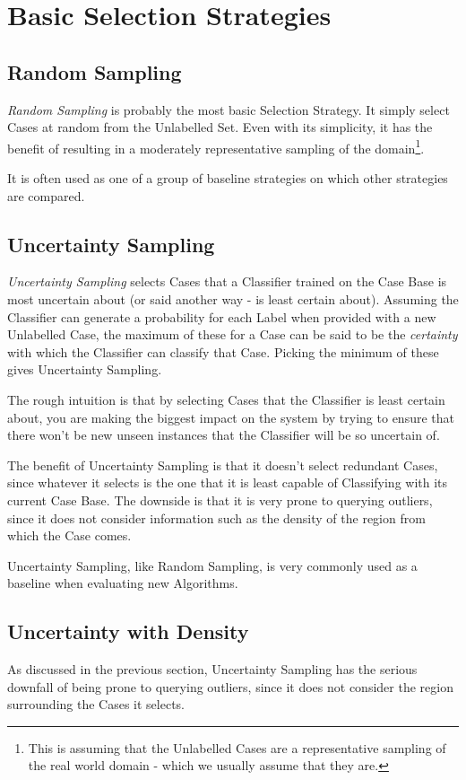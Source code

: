 \documentclass[a4paper,11pt]{report}
\begin{document}
\section{Basic Selection Strategies}
\subsection{Random Sampling}
\emph{Random Sampling} is probably the most basic Selection Strategy. It simply select Cases at random from the Unlabelled Set. Even with its simplicity, it has the benefit of resulting in a moderately representative sampling of the domain\footnote{This is assuming that the Unlabelled Cases are a representative sampling of the real world domain - which we usually assume that they are.}.

It is often used as one of a group of baseline strategies on which other strategies are compared.

\subsection{Uncertainty Sampling}
\emph{Uncertainty Sampling}\citep{Lewis1994} selects Cases that a Classifier trained on the Case Base is most uncertain about (or said another way - is least certain about). Assuming the Classifier can generate a probability for each Label when provided with a new Unlabelled Case, the maximum of these for a Case can be said to be the \emph{certainty} with which the Classifier can classify that Case. Picking the minimum of these gives Uncertainty Sampling.

The rough intuition is that by selecting Cases that the Classifier is least certain about, you are making the biggest impact on the system by trying to ensure that there won't be new unseen instances that the Classifier will be so uncertain of.

The benefit of Uncertainty Sampling is that it doesn't select redundant Cases, since whatever it selects is the one that it is least capable of Classifying with its current Case Base. The downside is that it is very prone to querying outliers, since it does not consider information such as the density of the region from which the Case comes.

Uncertainty Sampling, like Random Sampling, is very commonly used as a baseline when evaluating new Algorithms.

\subsection{Uncertainty with Density}
As discussed in the previous section, Uncertainty Sampling has the serious downfall of being prone to querying outliers, since it does not consider the region surrounding the Cases it selects.
\end{document}
